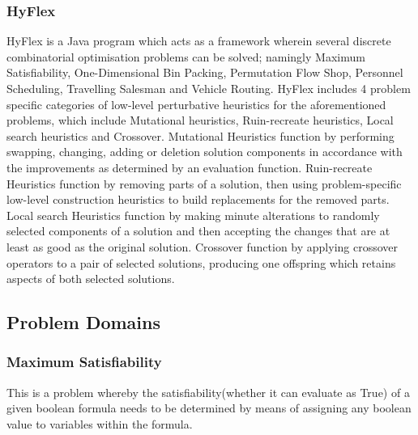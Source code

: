 \documentclass[a4paper,12pt]{article}
\begin{document}
        \subsubsection{HyFlex}
            \par{
            HyFlex is a Java program which acts as a framework wherein several discrete combinatorial optimisation problems can be solved; namingly Maximum Satisfiability, One-Dimensional Bin Packing, Permutation Flow Shop, Personnel Scheduling, Travelling Salesman and Vehicle Routing.\newline
            \newline
            HyFlex includes 4 problem specific categories of low-level perturbative heuristics for the aforementioned problems, which include Mutational heuristics, Ruin-recreate heuristics, Local search heuristics and Crossover\cite{hyperheuristictas}.\newline
            \newline 
            Mutational Heuristics function by performing swapping, changing, adding or deletion solution components in accordance with the improvements as determined by an evaluation function.\newline
            \newline
            Ruin-recreate Heuristics function by removing parts of a solution, then using problem-specific low-level construction heuristics to build replacements for the removed parts.\newline
            \newline
            Local search Heuristics function by making minute alterations to randomly selected components of a solution and then accepting the changes that are at least as good as the original solution.\newline
            \newline
            Crossover function by applying crossover operators to a pair of selected solutions, producing one offspring which retains aspects of both selected solutions.
            }  
    \subsection{Problem Domains}
        \subsubsection{Maximum Satisfiability}
            \par{
            This is a problem whereby the satisfiability(whether it can evaluate as True) of a given boolean formula needs to be determined by means of assigning any boolean value to variables within the formula. 
            }
\end{document}

